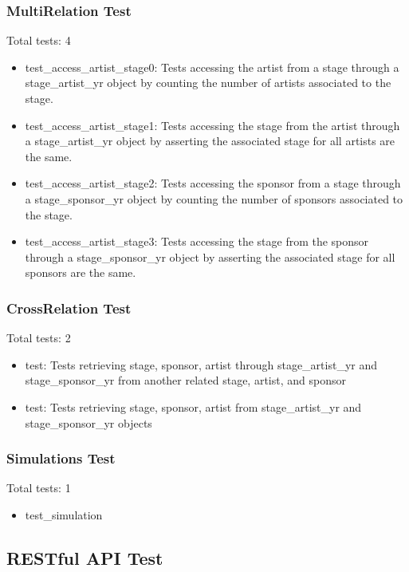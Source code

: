 \documentclass[12pt,english]{scrartcl}
\begin{document}
\subsubsection{MultiRelation Test} 
Total tests: 4

\begin{itemize}
 \item test\_access\_artist\_stage0: Tests accessing the artist from a stage through a stage_artist_yr object by counting the number of artists associated to the stage.
 \item test\_access\_artist\_stage1: Tests accessing the stage from the artist through a stage_artist_yr object by asserting the associated stage for all artists are the same.
 \item test\_access\_artist\_stage2: Tests accessing the sponsor from a stage through a stage_sponsor_yr object by counting the number of sponsors associated to the stage.
 \item test\_access\_artist\_stage3: Tests accessing the stage from the sponsor through a stage_sponsor_yr object by asserting the associated stage for all sponsors are the same.
\end{itemize}


\subsubsection{CrossRelation Test}

Total tests: 2

\begin{itemize}
 \item test\cross{}: Tests retrieving stage, sponsor, artist through stage_artist_yr and stage_sponsor_yr from another related stage, artist, and sponsor
 \item test\cross{}: Tests retrieving stage, sponsor, artist from stage_artist_yr and stage_sponsor_yr objects
\end{itemize}


\subsubsection{Simulations Test}

Total tests: 1

\begin{itemize}
 \item test_simulation
\end{itemize}


\subsection{RESTful API Test} 
\end{document}
